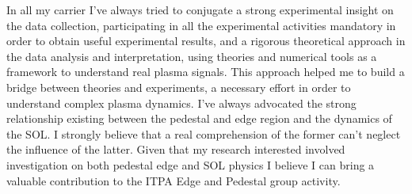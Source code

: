 In all my carrier I've always tried to conjugate a strong experimental
insight on the data collection, participating in all the experimental
activities mandatory in order to obtain useful experimental results, and a rigorous theoretical approach in
the data analysis and interpretation, using theories and numerical
tools as a framework to understand real plasma signals. This
approach helped me to build a bridge between theories and experiments,
a necessary effort in order to understand complex plasma
dynamics. I've always advocated the strong relationship existing
between the pedestal and edge region and the dynamics of the SOL. I
strongly believe that a real comprehension of the former can't neglect
the influence of the latter. Given that my research interested
involved investigation on both pedestal edge and SOL physics I believe
I can bring a valuable contribution to the ITPA Edge and Pedestal
group activity. 

